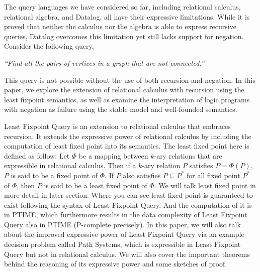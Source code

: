 The query languages we have considered so far, including relational calculus, 
relational algebra, and Datalog, all have their expressive limitations. While 
it is proved that neither the calculus nor the algebra is able to express 
recursive queries, Datalog overcomes this limitation yet still lacks support 
for negation. Consider the following query,
\begin{displayquote}
    \textit{``Find all the pairs of vertices in a 
    graph that are not connected.''}
\end{displayquote}
This query is not possible without the use of both recursion and negation. 
In this paper, we explore the extension of relational calculus with 
recursion using the least fixpoint semantics, as well as examine the interpretation  
of logic programs with negation as failure using the stable model 
and well-founded semantics.

Least Fixpoint Query is an extension to relational calculus that embraces recursion. It extends the expressive power of relational calculus by including the computation of least fixed point into its semantics. The least fixed point here is defined as follow: 
Let $\Phi$ be a mapping between $k$-ary relations that are expressible in relational calculus. Then if a $k$-ary relation $P$ satisfies $P= \Phi(P)$, $P$ is said to be a fixed point of $\Phi$. If $P$ also satisfies $P \subseteq P^*$ for all fixed point $P^*$ of $\Phi$, then $P$ is said to be a least fixed point of $\Phi$.
We will talk least fixed point in more detail in later section. Where you can see least fixed point is guaranteed to exist following the syntax of Least Fixpoint Query. And the computation of it is in PTIME, which furthermore results in the data complexity of Least Fixpoint Query also in PTIME (P-complete precisely). 
In this paper, we will also talk about the improved expressive power of Least Fixpoint Query via an example decision problem called Path Systems, which is expressible in Least Fixpoint Query but not in relational calculus. We will also cover the important theorems behind the reasoning of its expressive power and some sketches of proof.


